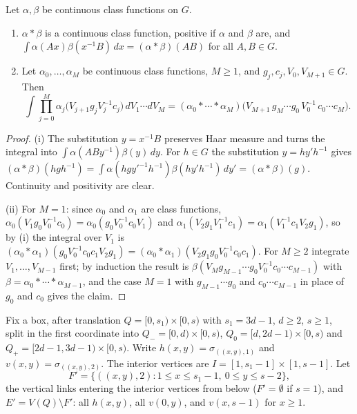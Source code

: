 \begin{lemma}[merging]\label{lem:merge}
Let $\alpha,\beta$ be continuous class functions on $G$.
\begin{enumerate}[label=\textup{(\roman*)},leftmargin=*]
\item $\alpha*\beta$ is a continuous class function, positive if $\alpha$ and
$\beta$ are, and $\int\alpha(Ax)\beta(x^{-1}B)\,dx=(\alpha*\beta)(AB)$ for all
$A,B\in G$.
\item Let $\alpha_0,\dots,\alpha_M$ be continuous class functions, $M\ge1$, and
$g_j,c_j,V_0,V_{M+1}\in G$. Then
\[
\int\prod_{j=0}^M\alpha_j\bigl(V_{j+1}g_jV_j^{-1}c_j\bigr)\,dV_1\cdots dV_M=
(\alpha_0*\cdots*\alpha_M)\bigl(V_{M+1}\,g_M\cdots g_0\,V_0^{-1}\,c_0\cdots c_M
\bigr).
\]
\end{enumerate}
\end{lemma}

\begin{proof}
(i) The substitution $y=x^{-1}B$ preserves Haar measure and turns the integral
into $\int\alpha(ABy^{-1})\beta(y)\,dy$. For $h\in G$ the substitution $y=hy'
h^{-1}$ gives $(\alpha*\beta)(hgh^{-1})=\int\alpha(hgy'^{-1}h^{-1})\beta(hy'
h^{-1})\,dy'=(\alpha*\beta)(g)$. Continuity and positivity are clear.

(ii) For $M=1$: since $\alpha_0$ and $\alpha_1$ are class functions,
$\alpha_0(V_1g_0V_0^{-1}c_0)=\alpha_0(g_0V_0^{-1}c_0V_1)$ and $\alpha_1(V_2g_1
V_1^{-1}c_1)=\alpha_1(V_1^{-1}c_1V_2g_1)$, so by (i) the integral over $V_1$ is
$(\alpha_0*\alpha_1)(g_0V_0^{-1}c_0c_1V_2g_1)=(\alpha_0*\alpha_1)(V_2g_1g_0
V_0^{-1}c_0c_1)$. For $M\ge2$ integrate $V_1,\dots,V_{M-1}$ first; by
induction the result is $\beta(V_Mg_{M-1}\cdots g_0V_0^{-1}c_0\cdots c_{M-1})$
with $\beta=\alpha_0*\cdots*\alpha_{M-1}$, and the case $M=1$ with
$g_{M-1}\cdots g_0$ and $c_0\cdots c_{M-1}$ in place of $g_0$ and $c_0$ gives
the claim.
\end{proof}

Fix a box, after translation $Q=[0,s_1)\times[0,s)$ with $s_1=3d-1$, $d\ge2$,
$s\ge1$, split in the first coordinate into $Q_-=[0,d)\times[0,s)$, $Q_0=
[d,2d-1)\times[0,s)$ and $Q_+=[2d-1,3d-1)\times[0,s)$. Write $h(x,y)=
\sigma_{((x,y),1)}$ and $v(x,y)=\sigma_{((x,y),2)}$. The interior vertices are
$I=[1,s_1-1]\times[1,s-1]$. Let
\[
F'=\{((x,y),2):1\le x\le s_1-1,\ 0\le y\le s-2\},
\]
the vertical links entering the interior vertices from below ($F'=\emptyset$
if $s=1$), and $E'=V(Q)\setminus F'$: all $h(x,y)$, all $v(0,y)$, and
$v(x,s-1)$ for $x\ge1$.

